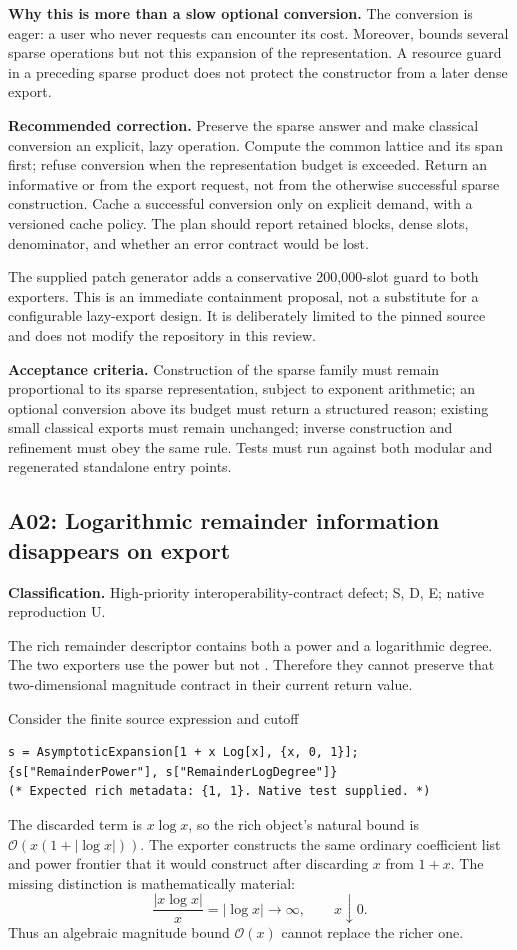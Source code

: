 \documentclass[11pt,a4paper]{article}
\newcommand{\code}[1]{\texttt{\detokenize{#1}}}
\newcommand{\OO}{\mathcal O}
\newcommand{\finding}[3]{\subsection{#1: #2}\textbf{Classification.} #3\par}
\begin{document}
\textbf{Why this is more than a slow optional conversion.} The conversion
is eager: a user who never requests \code{s["SeriesData"]} can encounter
its cost. Moreover, \code{"MaxTerms"} bounds several sparse operations but
not this expansion of the representation. A resource guard in a preceding
sparse product does not protect the constructor from a later dense export.

\textbf{Recommended correction.} Preserve the sparse answer and make
classical conversion an explicit, lazy operation. Compute the common
lattice and its span first; refuse conversion when the representation
budget is exceeded. Return an informative \code{Missing} or \code{Failure}
from the export request, not from the otherwise successful sparse
construction. Cache a successful conversion only on explicit demand, with
a versioned cache policy. The plan should report retained blocks, dense
slots, denominator, and whether an error contract would be lost.

The supplied patch generator adds a conservative 200,000-slot guard to
both exporters. This is an immediate containment proposal, not a substitute
for a configurable lazy-export design. It is deliberately limited to the
pinned source and does not modify the repository in this review.

\textbf{Acceptance criteria.} Construction of the sparse family must remain
proportional to its sparse representation, subject to exponent arithmetic;
an optional conversion above its budget must return a structured reason;
existing small classical exports must remain unchanged; inverse construction
and refinement must obey the same rule. Tests must run against both modular
and regenerated standalone entry points.

\finding{A02}{Logarithmic remainder information disappears on export}{High-priority interoperability-contract defect; S, D, E; native reproduction U.}
The rich remainder descriptor contains both a power and a logarithmic
degree. The two exporters use the power but not
\code{remData[[2]]}. Therefore they cannot preserve that two-dimensional
magnitude contract in their current return value.
\cite{core}

Consider the finite source expression and cutoff
\begin{lstlisting}
s = AsymptoticExpansion[1 + x Log[x], {x, 0, 1}];
{s["RemainderPower"], s["RemainderLogDegree"]}
(* Expected rich metadata: {1, 1}. Native test supplied. *)
\end{lstlisting}
The discarded term is $x\log x$, so the rich object's natural bound is
$\OO(x(1+|\log x|))$. The exporter constructs the same ordinary coefficient
list and power frontier that it would construct after discarding $x$ from
$1+x$. The missing distinction is mathematically material:
\[
 \frac{|x\log x|}{x}=|\log x|\longrightarrow\infty,
 \qquad x\downarrow0.
\]
Thus an algebraic magnitude bound $\OO(x)$ cannot replace the richer one.
\end{document}
